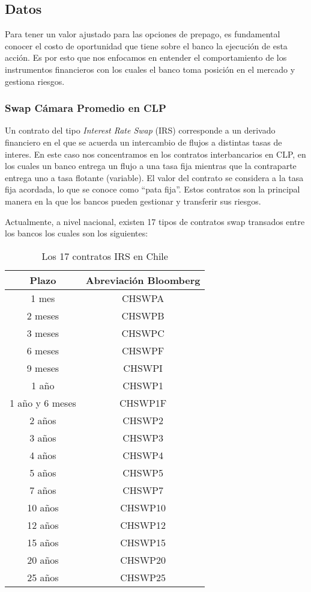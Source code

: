 \subsection{Datos}

\qquad Para tener un valor ajustado para las opciones de prepago, es fundamental conocer el costo de oportunidad que tiene sobre el banco la ejecución de esta acción. Es por esto que nos enfocamos en entender el comportamiento de los instrumentos financieros con los cuales el banco toma posición en el mercado y gestiona riesgos.

\subsubsection{Swap Cámara Promedio en CLP}

\qquad Un contrato del tipo \textit{Interest Rate Swap} (IRS) corresponde a un derivado financiero en el que se acuerda un intercambio de flujos a distintas tasas de interes. En este caso nos concentramos en los contratos interbancarios en CLP, en los cuales un banco entrega un flujo a una tasa fija mientras que la contraparte entrega uno a tasa flotante (variable). El valor del contrato se considera a la tasa fija acordada, lo que se conoce como ``pata fija''. Estos contratos son la principal manera en la que los bancos pueden gestionar y transferir sus riesgos.

\qquad Actualmente, a nivel nacional, existen 17 tipos de contratos swap 
transados entre los bancos los cuales son los siguientes:
\begin{table}[H]
\centering

    \begin{tabular}{| c | c |}
    \hline
    Plazo & Abreviación Bloomberg \\ \hline
    1 mes & CHSWPA \\ \hline
    2 meses & CHSWPB \\ \hline
    3 meses & CHSWPC \\ \hline
    6 meses & CHSWPF \\ \hline
    9 meses & CHSWPI \\ \hline
    1 año & CHSWP1 \\ \hline
    1 año y 6 meses & CHSWP1F \\ \hline
    2 años & CHSWP2 \\ \hline
    3 años & CHSWP3 \\ \hline
    4 años & CHSWP4 \\ \hline
    5 años & CHSWP5 \\ \hline
    7 años & CHSWP7 \\ \hline
    10 años & CHSWP10 \\ \hline
    12 años & CHSWP12 \\ \hline
    15 años & CHSWP15 \\ \hline
    20 años & CHSWP20 \\ \hline
    25 años & CHSWP25 \\ \hline
\end{tabular}
\caption{Los 17 contratos IRS en Chile}\label{fig:tenores}

\end{table}


